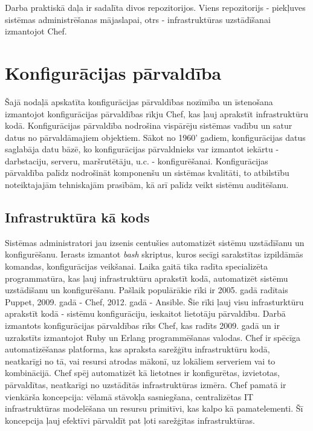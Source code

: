 Darba praktiskā daļa ir sadalīta divos repozitorijos. Viens repozitorijs - piekļuves sistēmas administrēšanas mājaslapai, otrs - infrastruktūras uzstādīšanai izmantojot Chef.

\chapter{Konfigurācijas pārvaldība}
Šajā nodaļā apskatīta konfigurācijas pārvaldības nozīmība un īstenošana izmantojot konfigurācijas pārvaldības rīkju Chef, kas ļauj aprakstīt infrastruktūru kodā.
Konfigurācijas pārvaldība nodrošina vispārēju sistēmas vadību un satur datus no pārvaldāmajiem objektiem. Sākot no 1960' gadiem, konfigurācijas datus saglabāja datu bāzē, ko konfigurācijas pārvaldnieks var izmantot iekārtu - darbstaciju, serveru, maršrutētāju, u.c. - konfigurēšanai.
Konfigurācijas pārvaldība palīdz nodrošināt komponenšu un sistēmas kvalitāti, to atbilstību noteiktajajām tehniskajām prasībām, kā arī palīdz veikt sistēmu auditēšanu.

\section{Infrastruktūra kā kods}
Sistēmas administratori jau izsenis centušies automatizēt sistēmu uzstādīšanu un konfigurēšanu. Ierasts izmantot \textit{bash} skriptus, kuros secīgi sarakstītas izpildāmās komandas, konfigurācijas veikšanai. Laika gaitā tika radīta specializēta programmatūra, kas ļauj infrastruktūru aprakstīt kodā, automatizēt sistēmu uzstādīšanu un konfigurēšanu. Pašlaik populārākie rīki ir 2005. gadā radītais Puppet, 2009. gadā - Chef, 2012. gadā - Ansible. Šie rīki ļauj visu infrasturktūru aprakstīt kodā - sistēmu konfigurāciju, ieskaitot lietotāju pārvaldību. Darbā izmantots konfigurācijas pārvaldības rīks Chef, kas radīts 2009. gadā un ir uzrakstīts izmantojot Ruby un Erlang programmēšanas valodas.
Chef ir spēcīga automatizēšanas platforma, kas apraksta sarežģītu infrastruktūru kodā, neatkarīgi no tā, vai resursi atrodas mākonī, uz lokāliem serveriem vai to kombinācijā. Chef spēj automatizēt kā lietotnes ir konfigurētas, izvietotas, pārvaldītas, neatkarīgi no uzstādītās infrastruktūras izmēra. \cite{chef-docs}
Chef pamatā ir vienkārša koncepcija: vēlamā stāvokļa sasniegšana, centralizētas IT infrastruktūras modelēšana un resursu primitīvi, kas kalpo kā pamatelementi. Šī koncepcija ļauj efektīvi pārvaldīt pat ļoti sarežģītas infrastruktūras.
